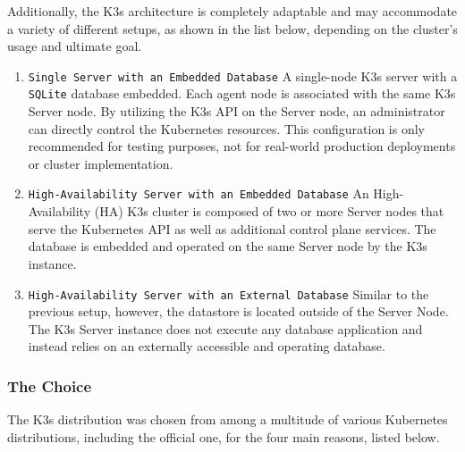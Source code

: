 Additionally, the K3s architecture is completely adaptable and may accommodate a
variety of different setups, as shown in the list below, depending on the
cluster's usage and ultimate goal\cite{k3s_architecture}.
\begin{enumerate}
  \item \texttt{Single Server with an Embedded Database}
    \newline
    A single-node K3s server with a \texttt{SQLite} database embedded. Each
    agent node is associated with the same K3s Server node. By utilizing the K3s
    API on the Server node, an administrator can directly control the Kubernetes
    resources.
    \newline
    This configuration is only recommended for testing purposes, not for real-world
    production deployments or cluster implementation.

  \item \texttt{High-Availability Server with an Embedded Database}
    \newline
    An High-Availability (HA) K3s cluster is composed of two or more Server
    nodes that serve the Kubernetes API as well as additional control plane
    services. The database is embedded and operated on the same Server node by the
    K3s instance.

  \item \texttt{High-Availability Server with an External Database}
    \newline
    Similar to the previous setup, however, the datastore is located outside of
    the Server Node. The K3s Server instance does not execute any database application
    and instead relies on an externally accessible and operating database.
\end{enumerate}

\subsubsection{The Choice}
\label{subsubsec:implementation_dependencies_k3s_the_choice}

The K3s distribution was chosen from among a multitude of various Kubernetes
distributions, including the official one, for the four main reasons, listed below.


